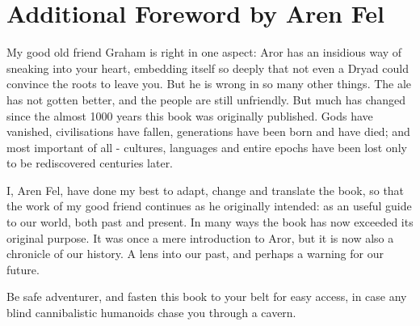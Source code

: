 \section{Additional Foreword by Aren Fel}

My good old friend Graham is right in one aspect: Aror has an insidious
way of sneaking into your heart, embedding itself so deeply that not
even a Dryad could convince the roots to leave you. But he is wrong in
so many other things. The ale has not gotten better, and the people
are still unfriendly. But much has changed since the almost 1000 years
this book was originally published. Gods have vanished, civilisations
have fallen, generations have been born and have died; and most important
of all - cultures, languages and entire epochs have been lost only to be
rediscovered centuries later.

I, Aren Fel, have done my best to adapt, change and translate the
book, so that the work of my good friend continues as he originally
intended: as an useful guide to our world, both past and present. In
many ways the book has now exceeded its original purpose. It was once
a mere introduction to Aror, but it is now also a chronicle of our
history. A lens into our past, and perhaps a warning for our future.

Be safe adventurer, and fasten this book to your belt for easy access,
in case any blind cannibalistic humanoids chase you through a cavern.
\twocolumn
